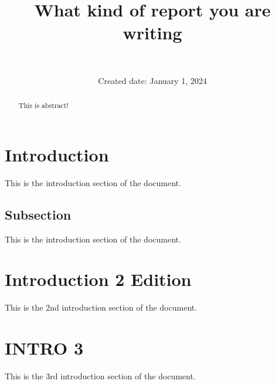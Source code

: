 \documentclass[12pt]{article} %
\title{%
    {\large What kind of report you are writing} \\
    \textbf{{\huge \topic}}%
}
\author{%
    \name \\
    \ttfamily{yygarypeng@gapp.nthu.edu.tw}%
}
\affil{%
    Dept. of Physics, Natl. Tsing Hua Univ.%
}
\date{%
    Created date: January 1, 2024%
}
\begin{document}
\makefront %


\begin{abstract}
    This is abstract! \\
    \lipsum[1]
\end{abstract}

\section{Introduction}
This is the introduction section of the document.
    \subsection{Subsection}
    This is the introduction section of the document.\lipsum[1]

\newpage
\section{Introduction 2 Edition}
This is the 2nd introduction section of the document.\lipsum[1]

\newpage
\section{INTRO 3}
This is the 3rd introduction section of the document.\lipsum[1]

\end{document}
